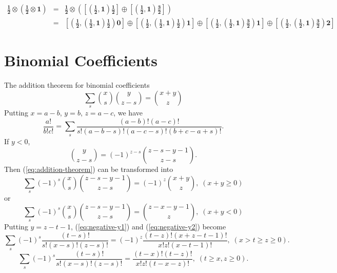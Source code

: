 \documentclass{article}
\begin{document}
\begin{eqnarray}
\mathbf{\frac{1}{2}} \otimes \left( \mathbf{\frac{1}{2}}  \otimes \mathbf{1} \right) 
    & = & \mathbf{\frac{1}{2} \otimes\left(\left[\left(\frac{1}{2}, 1\right) \frac{1}{2} \right] \oplus \left[\left(\frac{1}{2}, 1 \right) \frac{3}{2} \right]\right) }\nonumber\\
    & = & \mathbf{ \left[\left(\frac{1}{2}, \left(\frac{1}{2}, 1 \right) \frac{1}{2} \right) 0\right] \oplus \left[\left(\frac{1}{2}, \left(\frac{1}{2}, 1\right) \frac{1}{2} \right) 1 \right] \oplus \left[\left( \frac{1}{2}, \left(\frac{1}{2}, 1 \right) \frac{3}{2} \right) 1 \right] \oplus \left[\left(\frac{1}{2}, \left(\frac{1}{2}, 1 \right) \frac{3}{2} \right) 2 \right] }\nonumber
\end{eqnarray}
\appendix
\section{Binomial Coefficients}
\label{sec-6}
The addition theorem for binomial coefficients
\begin{equation}
\label{eq:addition-theorem}
\sum_{s} \binom{x}{s} \binom{y}{z-s} = \binom{x+y}{z}
\end{equation}
Putting $x = a-b$, $y=b$, $z=a-c$, we have
\begin{equation}
\label{fml:triple-formula}
\frac{a!}{b!c!}= \sum_{s} \frac{(a-b)!(a-c)!}{s!(a-b-s)!(a-c-s)!(b+c-a+s)!}.
\end{equation}
If $y < 0$, 
\begin{equation}
\label{sub:negative-y}
\binom{y}{z-s} = (-1)^{z-s} \binom{z-s-y-1}{z-s}.
\end{equation}
Then (\ref{eq:addition-theorem}) can be transformed into
\begin{equation}
\label{eq:negative-y1}
\sum_{s}(-1)^{s} \binom{x}{s} \binom{z-s-y-1}{z-s} = (-1)^{z}\binom{x+y}{z}, \; (x+y \ge 0)
\end{equation}
or
\begin{equation}
\label{eq:negative-y2}
\sum_{s}(-1)^{s} \binom{x}{s} \binom{z-s-y-1}{z-s} = \binom{z-x-y-1}{z}, \;(x+y < 0)
\end{equation}
Putting $y=z-t-1$, (\ref{eq:negative-y1}) and (\ref{eq:negative-y2}) become
\begin{equation}
\label{ }
\sum_{s} (-1)^{s}\frac{(t-s)!}{s!(x-s)!(z-s)!}= (-1)^z \frac{(t-z)!(x+z-t-1)!}{x!z!(x-t-1)!}, \;( x > t \ge z \ge 0).
\end{equation}
\begin{equation}
\label{}
\sum_{s} (-1)^{s}\frac{(t-s)!}{s!(x-s)!(z-s)!}= \frac{(t-x)!(t-z)!}{x!z!(t-x-z)!}, \; (t \ge x,z \ge 0).
\end{equation}
\end{document}
